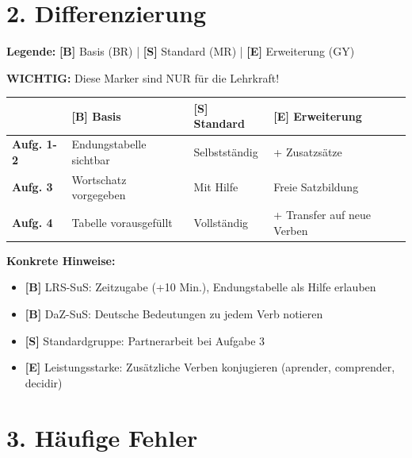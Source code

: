 \documentclass[11pt, a4paper]{article}
\newcommand{\B}{\textcolor{basis}{\textbf{[B]}}}
\newcommand{\Std}{\textcolor{standard}{\textbf{[S]}}}
\newcommand{\E}{\textcolor{erweiterung}{\textbf{[E]}}}
\begin{document}

\section*{2. Differenzierung}

\begin{differenzierung}
\textbf{Legende:} \B{} Basis (BR) | \Std{} Standard (MR) | \E{} Erweiterung (GY)

\vspace{0.5em}
\textbf{WICHTIG:} Diese Marker sind NUR für die Lehrkraft!
\end{differenzierung}

\vspace{1em}

\begin{tabularx}{\textwidth}{|l|X|X|X|}
\hline
& \B{} \textbf{Basis} & \Std{} \textbf{Standard} & \E{} \textbf{Erweiterung} \\
\hline
\textbf{Aufg. 1-2} & Endungstabelle sichtbar & Selbstständig & + Zusatzsätze \\
\hline
\textbf{Aufg. 3} & Wortschatz vorgegeben & Mit Hilfe & Freie Satzbildung \\
\hline
\textbf{Aufg. 4} & Tabelle vorausgefüllt & Vollständig & + Transfer auf neue Verben \\
\hline
\end{tabularx}

\vspace{1em}

\textbf{Konkrete Hinweise:}
\begin{itemize}
    \item \B{} LRS-SuS: Zeitzugabe (+10 Min.), Endungstabelle als Hilfe erlauben
    \item \B{} DaZ-SuS: Deutsche Bedeutungen zu jedem Verb notieren
    \item \Std{} Standardgruppe: Partnerarbeit bei Aufgabe 3
    \item \E{} Leistungsstarke: Zusätzliche Verben konjugieren (aprender, comprender, decidir)
\end{itemize}


\section*{3. Häufige Fehler}
\end{document}
